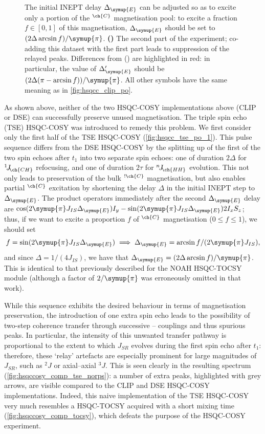 \documentclass[a4paper,12pt]{article}
\newcommand{\proton}{\ch{^{1}H}}
\newcommand{\DeltaE}{\Delta_{\symup{E}}}
\newcommand{\HH}{\proton{}--\proton{}}
\newcommand{\magn}[1]{\ch{^1H}$^{\ch{#1}}$}
\newcommand{\magnnot}[1]{\ch{^1H}$^{!\ch{#1}}$}
\newcommand{\oneJ}[1]{{}^{1}\!J_{\!\ch{#1}}}
\newcommand{\nJ}[1]{{}^{n}\!J_{\!\ch{#1}}}
\newcommand{\cpi}{\symup{\pi}}
\begin{document}
\begin{refsection}
\begin{figure}[!ht]
{        The initial INEPT delay $\DeltaE$ can be adjusted so as to excite only a portion of the \magn{C} magnetisation pool: to excite a fraction $f \in [0, 1]$ of this magnetisation, $\DeltaE$ should be set to $(2\Delta \arcsin f)/\cpi$.
        \textbf{()} The second part of the experiment; co-adding this dataset with the first part leads to suppression of the relayed peaks.
        Differences from () are highlighted in red: in particular, the value of $\DeltaE'$ should be $(2\Delta (\pi - \arcsin f))/\cpi$.
        All other symbols have the same meaning as in \cref{fig:hsqcc_clip_po}.
    }
    \label{fig:hsqcc_tse_po}
\end{figure}

As shown above, neither of the two HSQC-COSY implementations above (CLIP or DSE) can successfully preserve unused magnetisation.
The triple spin echo (TSE) HSQC-COSY was introduced to remedy this problem.
We first consider only the first half of the TSE HSQC-COSY (\cref{fig:hsqcc_tse_po_1}).
This pulse sequence differs from the DSE HSQC-COSY by the splitting up of the first of the two spin echoes after $t_1$ into two separate spin echoes: one of duration $2\Delta$ for $\oneJ{CH}$ refocusing, and one of duration $2\tau$ for $\nJ{HH}$ evolution.
This not only leads to preservation of the bulk \magnnot{C} magnetisation, but also enables partial \magn{C} excitation by shortening the delay $\Delta$ in the initial INEPT step to $\DeltaE$.
The product operators immediately after the second $\DeltaE$ delay are $\cos(2\cpi J_{IS} \DeltaE) I_y - \sin(2\cpi J_{IS} \DeltaE) 2I_xS_z$; thus, if we want to excite a proportion $f$ of \magn{C} magnetisation ($0 \leq f \leq 1$), we should set
$$f = \sin(2\cpi J_{IS} \DeltaE) \implies \DeltaE = \arcsin{f}/(2\cpi J_{IS}),$$
and since $\Delta = 1/(4J_{IS})$, we have that $\DeltaE = (2\Delta \arcsin{f}) / \cpi$.
This is identical to that previously described for the NOAH HSQC-TOCSY module\autocite{Yong2021JMR} (although a factor of $2/\cpi$ was erroneously omitted in that work).

While this sequence exhibits the desired behaviour in terms of magnetisation preservation, the introduction of one extra spin echo leads to the possibility of two-step coherence transfer through successive \HH{} couplings and thus spurious peaks.
In particular, the intensity of this unwanted transfer pathway is proportional to the extent to which $J_{SR}$ evolves during the first spin echo after $t_1$: therefore, these `relay' artefacts are especially prominent for large magnitudes of $J_{SR}$, such as $^2\!J$ or axial--axial $^3\!J$.
This is seen clearly in the resulting spectrum (\cref{fig:hsqccosy_comp_tse_norps}): a number of extra peaks, highlighted with grey arrows, are visible compared to the CLIP and DSE HSQC-COSY implementations.
Indeed, this naive implementation of the TSE HSQC-COSY very much resembles a HSQC-TOCSY acquired with a short mixing time (\cref{fig:hsqccosy_comp_tocsy}), which defeats the purpose of the HSQC-COSY experiment.


\end{refsection}
\end{document}
